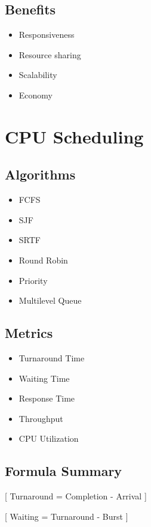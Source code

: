 \subsection*{Benefits}

\begin{itemize}
\item Responsiveness
\item Resource sharing
\item Scalability
\item Economy
\end{itemize}

\section{CPU Scheduling}

\subsection*{Algorithms}

\begin{itemize}
\item FCFS
\item SJF
\item SRTF
\item Round Robin
\item Priority
\item Multilevel Queue
\end{itemize}

\subsection*{Metrics}

\begin{itemize}
\item Turnaround Time
\item Waiting Time
\item Response Time
\item Throughput
\item CPU Utilization
\end{itemize}

\subsection*{Formula Summary}

[
Turnaround = Completion - Arrival
]

[
Waiting = Turnaround - Burst
]

